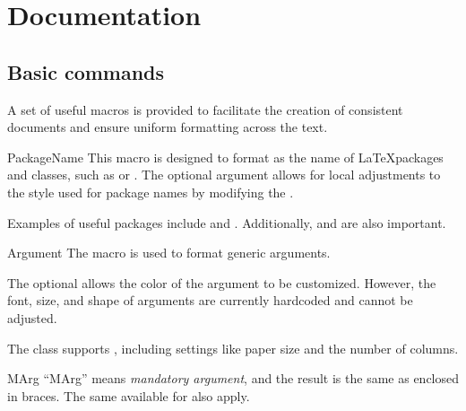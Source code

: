 \documentclass[11pt]{article}
\begin{document}
\section{Documentation}

\subsection{Basic commands}

A set of useful macros is provided to facilitate the creation of consistent documents and ensure uniform formatting across the text.

\begin{Macrodef}{PackageName}{}{}
    This macro is designed to format  as the name of \LaTeX packages and classes, such as  or . The optional argument  allows for local adjustments to the style used for package names by modifying the .
\end{Macrodef}

\begin{PDExample}
    Examples of useful packages include  and . Additionally,  and  are also important.
\end{PDExample}

\begin{Macrodef}{Argument}{}{}
    The  macro is used to format generic arguments.

    The optional  allows the color of the argument to be customized. However, the font, size, and shape of arguments are currently hardcoded and cannot be adjusted.
\end{Macrodef}

\begin{PDExample}
    The  class supports , including settings like paper size and the number of columns.
\end{PDExample}

\begin{Macrodef}{MArg}{}{}
    ``MArg'' means \textit{mandatory argument}, and the result is the same as  enclosed in braces. The same  available for  also apply.
\end{Macrodef}
\end{document}
